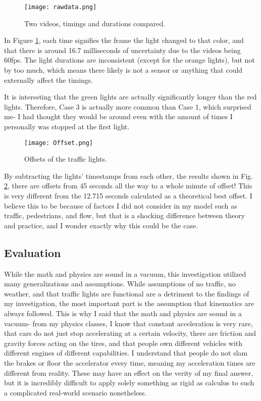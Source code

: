 \documentclass[11pt]{article}
\begin{document}
\begin{figure}[h!]
    \centering
    \texttt{[image: rawdata.png]}
    \caption{Two videos, timings and durations compared.}
    \label{rawdata}
\end{figure}

In Figure \ref{rawdata}, each time signifies the frame the light changed to that color, and that there is around 16.7 milliseconds of uncertainty due to the videos being 60fps. The light durations are inconsistent (except for the orange lights), but not by too much, which means there likely is not a sensor or anything that could externally affect the timings.

It is interesting that the green lights are actually significantly longer than the red lights. Therefore, Case 3 is actually more common than Case 1, which surprised me- I had thought they would be around even with the amount of times I personally was stopped at the first light.

\begin{figure}[h!tbp]
    \centering
    \texttt{[image: Offset.png]}
    \caption{Offsets of the traffic lights.}
    \label{offsets}
\end{figure}

By subtracting the lights' timestamps from each other, the results shown in Fig. \ref{offsets}, there are offsets from 45 seconds all the way to a whole minute of offset! This is very different from the 12.715 seconds calculated as a theoretical best offset. I believe this to be because of factors I did not consider in my model such as traffic, pedestrians, and flow, but that is a shocking difference between theory and practice, and I wonder exactly why this could be the case.

\subsection{Evaluation}

While the math and physics are sound in a vacuum, this investigation utilized many generalizations and assumptions. While assumptions of no traffic, no weather, and that traffic lights are functional are a detriment to the findings of my investigation, the most important part is the assumption that kinematics are always followed. This is why I said that the math and physics are sound in a vacuum- from my physics classes, I know that constant acceleration is very rare, that cars do not just stop accelerating at a certain velocity, there are friction and gravity forces acting on the tires, and that people own different vehicles with different engines of different capabilities. I understand that people do not slam the brakes or floor the accelerator every time, meaning my acceleration times are different from reality. These may have an effect on the verity of my final answer, but it is incredibly difficult to apply solely something as rigid as calculus to such a complicated real-world scenario nonetheless.
\end{document}
